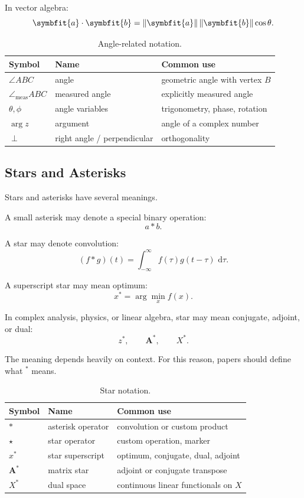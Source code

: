 \documentclass[11pt,twocolumn]{article}
\newcommand{\safeangle}{\angle}
\newcommand{\safemeasuredangle}{\angle_{\mathrm{meas}}}
\newcommand{\vct}[1]{\symbfit{#1}}   %
\newcommand{\mat}[1]{\symbf{#1}}     %
\newcommand{\norm}[1]{\left\lVert #1 \right\rVert}
\newcommand{\dd}{\,\mathrm{d}}
\begin{document}
In vector algebra:
\[
\vct{a}\cdot\vct{b}
=
\norm{\vct{a}}\norm{\vct{b}}\cos\theta.
\]

\begin{table}[ht]
\centering
\small
\caption{Angle-related notation.}
\begin{tabular}{lll}
\toprule
Symbol & Name & Common use \\
\midrule
$\safeangle ABC$ & angle & geometric angle with vertex \(B\) \\
$\safemeasuredangle ABC$ & measured angle & explicitly measured angle \\
$\theta,\phi$ & angle variables & trigonometry, phase, rotation \\
$\arg z$ & argument & angle of a complex number \\
$\perp$ & right angle / perpendicular & orthogonality \\
\bottomrule
\end{tabular}
\end{table}

\subsection{Stars and Asterisks}

Stars and asterisks have several meanings.

A small asterisk may denote a special binary operation:
\[
a \ast b.
\]

A star may denote convolution:
\[
(f \ast g)(t)
=
\int_{-\infty}^{\infty}
f(\tau)g(t-\tau)\,\dd\tau.
\]

A superscript star may mean optimum:
\[
x^*
=
\arg\min_x f(x).
\]

In complex analysis, physics, or linear algebra, star may mean conjugate,
adjoint, or dual:
\[
z^*,
\qquad
\mat{A}^*,
\qquad
X^*.
\]

The meaning depends heavily on context. For this reason, papers should define
what \(^*\) means.

\begin{table}[ht]
\centering
\small
\caption{Star notation.}
\begin{tabular}{lll}
\toprule
Symbol & Name & Common use \\
\midrule
$\ast$ & asterisk operator & convolution or custom product \\
$\star$ & star operator & custom operation, marker \\
$x^*$ & star superscript & optimum, conjugate, dual, adjoint \\
$\mat{A}^*$ & matrix star & adjoint or conjugate transpose \\
$X^*$ & dual space & continuous linear functionals on \(X\) \\
\bottomrule
\end{tabular}
\end{table}
\end{document}
